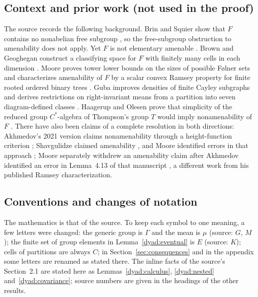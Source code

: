 \documentclass[11pt]{article}
\theoremstyle{definition}
\numberwithin{equation}{section}
\begin{document}
\subsection{Context and prior work (not used in the proof)}
The source records the following background. Brin and Squier show that
\(F\) contains no nonabelian free subgroup
\cite[Theorem~3.1]{BrinSquier1985}, so the free-subgroup obstruction to
amenability does not apply. Yet \(F\) is not elementary amenable
\cite[Theorem~4.10]{CannonFloydParry1996}. Brown and Geoghegan construct a
classifying space for \(F\) with finitely many cells in each dimension
\cite{BrownGeoghegan1984}. Moore proves tower lower bounds on the sizes of
possible F\o lner sets \cite[Theorem~1.1]{MooreFolner2013} and
characterizes amenability of \(F\) by a scalar convex Ramsey property for
finite rooted ordered binary trees \cite[Theorem~3.1]{Moore2013}. Guba
improves densities of finite Cayley subgraphs \cite{Guba2025Density} and
derives restrictions on right-invariant means from a partition into seven
diagram-defined classes \cite{Guba2026}. Haagerup and Olesen prove that
simplicity of the reduced group \(C^*\)-algebra of Thompson's group \(T\)
would imply nonamenability of \(F\)
\cite[Theorem~5.5]{HaagerupOlesen2017}. There have also been claims of a
complete resolution in both directions: Akhmedov's 2021 version claims
nonamenability through a height-function criterion \cite{Akhmedov2021};
Shavgulidze claimed amenability \cite{Shavgulidze2009}, and Moore
identified errors in that approach \cite{Moore2011Critique}; Moore
separately withdrew an amenability claim after Akhmedov identified an
error in Lemma~4.13 of that manuscript \cite{Moore2012Withdrawn}, a
different work from his published Ramsey characterization.

\subsection{Conventions and changes of notation}
The mathematics is that of the source. To keep each symbol to one meaning,
a few letters were changed: the generic group is \(\Gamma\) and the mean
is \(\mu\) (source: \(G\), \(M\)); the finite set of group elements in
Lemma~\ref{dyad:eventual} is \(E\) (source: \(K\)); cells of partitions
are always \(C\); in Section~\ref{sec:consequences} and in the appendix
some letters are renamed as stated there. The inline facts of the source's
Section~2.1 are stated here as Lemmas~\ref{dyad:calculus},
\ref{dyad:nested} and~\ref{dyad:covariance}; source numbers are given in
the headings of the other results.
\end{document}
